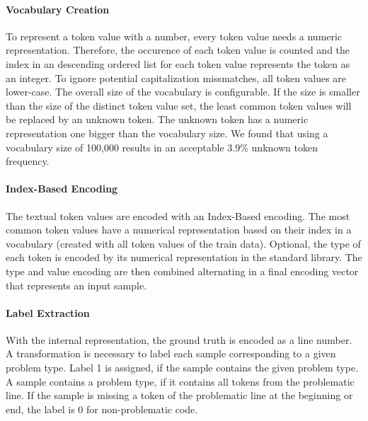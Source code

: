 \paragraph{Vocabulary Creation}
To represent a token value with a number, every token value needs a numeric representation. Therefore, the occurence of each token value is counted and the index in an descending ordered list for each token value represents the token as an integer. To ignore potential capitalization missmatches, all token values are lower-case. The overall size of the vocabulary is configurable. If the size is smaller than the size of the distinct token value set, the least common token values will be replaced by an unknown token. The unknown token has a numeric representation one bigger than the vocabulary size. We found that using a vocabulary size of 100,000 results in an acceptable 3.9\% unknown token frequency.
\paragraph{Index-Based Encoding}
The textual token values are encoded with an Index-Based encoding. The most common token values have a numerical representation based on their index in a vocabulary (created with all token values of the train data). Optional, the type of each token is encoded by its numerical representation in the standard library. The type and value encoding are then combined alternating in a final encoding vector that represents an input sample.
\paragraph{Label Extraction}
With the internal representation, the ground truth is encoded as a line number. A transformation is necessary to label each sample corresponding to a given problem type. Label 1 is assigned, if the sample contains the given problem type. A sample contains a problem type, if it contains all tokens from the problematic line. If the sample is missing a token of the problematic line at the beginning or end, the label is 0 for non-problematic code. 

